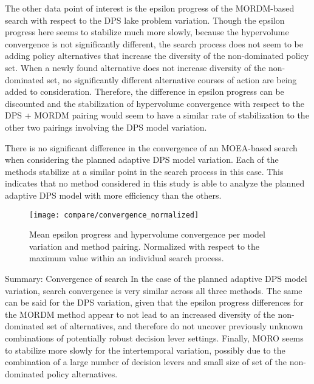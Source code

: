     The other data point of interest is the epsilon progress of the MORDM-based search with respect to the DPS lake problem variation. Though the epsilon progress here seems to stabilize much more slowly, because the hypervolume convergence is not significantly different, the search process does not seem to be adding policy alternatives that increase the diversity of the non-dominated policy set. When a newly found alternative does not increase diversity of the non-dominated set, no significantly different alternative courses of action are being added to consideration. Therefore, the difference in epsilon progress can be discounted and the stabilization of hypervolume convergence with respect to the DPS + MORDM pairing would seem to have a similar rate of stabilization to the other two pairings involving the DPS model variation. 
    
    There is no significant difference in the convergence of an MOEA-based search when considering the planned adaptive DPS model variation. Each of the methods stabilize at a similar point in the search process in this case. This indicates that no method considered in this study is able to analyze the planned adaptive DPS model with more efficiency than the others. 
    
    \begin{figure}[t!]
        \centering
        \captionsetup{width=\textwidth}
        
        \texttt{[image: compare/convergence\_normalized]}
        \caption[Mean epsilon progress across all pairings and search repetitions]{Mean epsilon progress and hypervolume convergence per model variation and method pairing. Normalized with respect to the maximum value within an individual search process.}
        \label{fig:compare-convergence}
    \end{figure}
    
    \begin{comparisonbox}{Summary: Convergence of search}
        In the case of the planned adaptive DPS model variation, search convergence is very similar across all three methods. The same can be said for the DPS variation, given that the epsilon progress differences for the MORDM method appear to not lead to an increased diversity of the non-dominated set of alternatives, and therefore do not uncover previously unknown combinations of potentially robust decision lever settings. Finally, MORO seems to stabilize more slowly for the intertemporal variation, possibly due to the combination of a large number of decision levers and small size of set of the non-dominated policy alternatives. 
    \end{comparisonbox}
    

